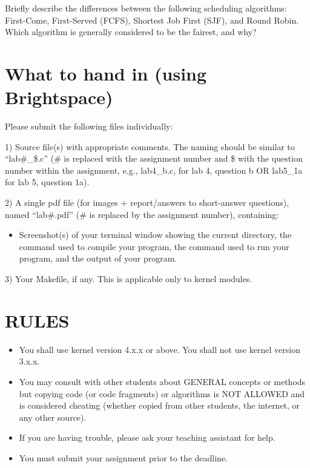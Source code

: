 \documentclass{article}
\begin{document}
Briefly describe the differences between the following scheduling algorithms: First-Come, First-Served (FCFS), Shortest Job First (SJF), and Round Robin.  Which algorithm is generally considered to be the fairest, and why?


\section*{What to hand in (using Brightspace)}

Please submit the following files individually:

1) Source file(s) with appropriate comments. The naming should be similar to “lab\#\_\$.c” (\# is replaced with the assignment number and \$ with the question number within the assignment, e.g., lab4\_b.c, for lab 4, question b OR lab5\_1a for lab 5, question 1a).

2) A single pdf file (for images + report/answers to short-answer questions), named “lab\#.pdf” (\# is replaced by the assignment number), containing:
    \begin{itemize}
        \item Screenshot(s) of your terminal window showing the current directory, the command used to compile your program, the command used to run your program, and the output of your program.
    \end{itemize}

3) Your Makefile, if any. This is applicable only to kernel modules.


\section*{RULES}

\begin{itemize}
    \item You shall use kernel version 4.x.x or above. You shall not use kernel version 3.x.x.
    \item You may consult with other students about GENERAL concepts or methods but copying code (or code fragments) or algorithms is NOT ALLOWED and is considered cheating (whether copied from other students, the internet, or any other source).
    \item If you are having trouble, please ask your teaching assistant for help.
    \item You must submit your assignment prior to the deadline.
\end{itemize}
\end{document}
